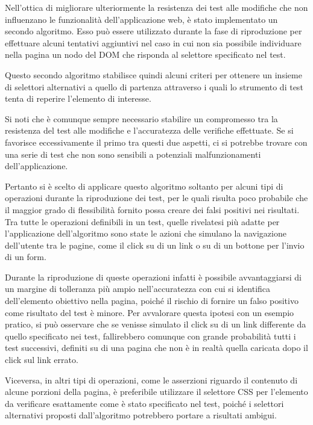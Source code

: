 \documentclass[12pt]{toptesi}
\begin{document}
Nell'ottica di migliorare ulteriormente la resistenza dei test alle modifiche che non influenzano le funzionalità dell'applicazione web, è stato implementato un secondo algoritmo. Esso può essere utilizzato durante la fase di riproduzione per effettuare alcuni tentativi aggiuntivi nel caso in cui non sia possibile individuare nella pagina un nodo del DOM che risponda al selettore specificato nel test.

Questo secondo algoritmo stabilisce quindi alcuni criteri per ottenere un insieme di selettori alternativi a quello di partenza attraverso i quali lo strumento di test tenta di reperire l'elemento di interesse. 

Si noti che è comunque sempre necessario stabilire un compromesso tra la resistenza del test alle modifiche e l'accuratezza delle verifiche effettuate. Se si favorisce eccessivamente il primo tra questi due aspetti, ci si potrebbe trovare con una serie di test che non sono sensibili a potenziali malfunzionamenti dell'applicazione.

Pertanto si è scelto di applicare questo algoritmo soltanto per alcuni tipi di operazioni durante la riproduzione dei test, per le quali risulta poco probabile che il maggior grado di flessibilità fornito possa creare dei falsi positivi nei risultati. Tra tutte le operazioni definibili in un test, quelle rivelatesi più adatte per l'applicazione dell'algoritmo sono state le azioni che simulano la navigazione dell'utente tra le pagine, come il click su di un link o su di un bottone per l'invio di un form.

Durante la riproduzione di queste operazioni infatti è possibile avvantaggiarsi di un margine di tolleranza più ampio nell'accuratezza con cui si identifica dell'elemento obiettivo nella pagina, poiché il rischio di fornire un falso positivo come risultato del test è minore. Per avvalorare questa ipotesi con un esempio pratico, si può osservare che se venisse simulato il click su di un link differente da quello specificato nei test, fallirebbero comunque con grande probabilità tutti i test successivi, definiti su di una pagina che non è in realtà quella caricata dopo il click sul link errato.

Viceversa, in altri tipi di operazioni, come le asserzioni riguardo il contenuto di alcune porzioni della pagina, è preferibile utilizzare il selettore CSS per l'elemento da verificare esattamente come è stato specificato nel test, poiché i selettori alternativi proposti dall'algoritmo potrebbero portare a risultati ambigui.
\end{document}
